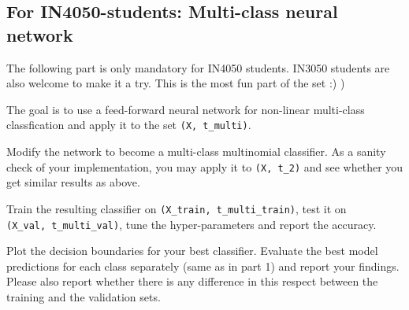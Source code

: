\documentclass[a4paper,landscape]{article}
\begin{document}
    \subsection{For IN4050-students: Multi-class neural
network}\label{for-in4050-students-multi-class-neural-network}

    The following part is only mandatory for IN4050 students. IN3050
students are also welcome to make it a try. This is the most fun part of
the set :) )

The goal is to use a feed-forward neural network for non-linear
multi-class classfication and apply it to the set
\texttt{(X,\ t\_multi)}.

Modify the network to become a multi-class multinomial classifier. As a
sanity check of your implementation, you may apply it to
\texttt{(X,\ t\_2)} and see whether you get similar results as above.

Train the resulting classifier on \texttt{(X\_train,\ t\_multi\_train)},
test it on \texttt{(X\_val,\ t\_multi\_val)}, tune the hyper-parameters
and report the accuracy.

Plot the decision boundaries for your best classifier. Evaluate the best
model predictions for each class separately (same as in part 1) and
report your findings. Please also report whether there is any difference
in this respect between the training and the validation sets.
\end{document}
